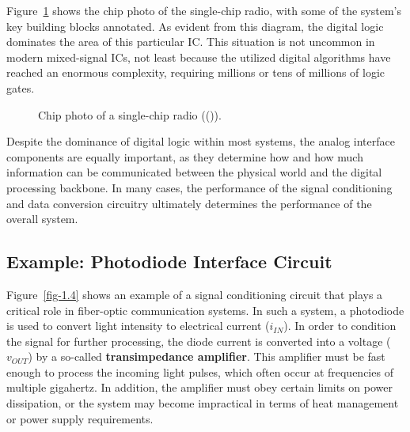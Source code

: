 \documentclass[
  11pt,
  letterpaper,
  abstract]{scrbook}
\begin{document}
Figure~\ref{fig-1.3} shows the chip photo of the single-chip radio, with
some of the system's key building blocks annotated. As evident from this
diagram, the digital logic dominates the area of this particular IC.
This situation is not uncommon in modern mixed-signal ICs, not least
because the utilized digital algorithms have reached an enormous
complexity, requiring millions or tens of millions of logic gates.

\begin{figure}


\caption{\label{fig-1.3}Chip photo of a single-chip radio
(()).}

\end{figure}%

Despite the dominance of digital logic within most systems, the analog
interface components are equally important, as they determine how and
how much information can be communicated between the physical world and
the digital processing backbone. In many cases, the performance of the
signal conditioning and data conversion circuitry ultimately determines
the performance of the overall system.

\subsection{Example: Photodiode Interface
Circuit}\label{example-photodiode-interface-circuit}

Figure~\ref{fig-1.4} shows an example of a signal conditioning circuit
that plays a critical role in fiber-optic communication systems. In such
a system, a photodiode is used to convert light intensity to electrical
current (\(i_{IN}\)). In order to condition the signal for further
processing, the diode current is converted into a voltage (\(v_{OUT}\))
by a so-called \textbf{transimpedance amplifier}. This amplifier must be
fast enough to process the incoming light pulses, which often occur at
frequencies of multiple gigahertz. In addition, the amplifier must obey
certain limits on power dissipation, or the system may become
impractical in terms of heat management or power supply requirements.
\end{document}
